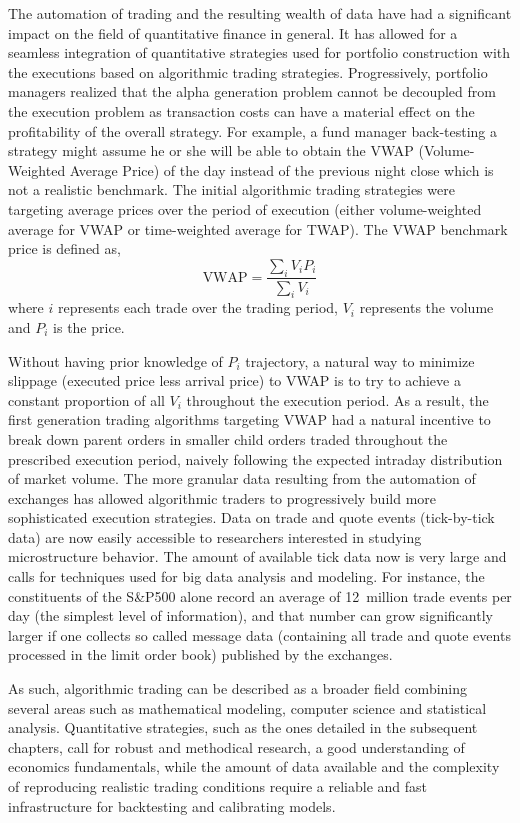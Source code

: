 The automation of trading and the resulting wealth of data have had a significant impact on the field of quantitative finance in general. It has allowed for a seamless integration of quantitative strategies used for portfolio construction with the executions based on algorithmic trading strategies. Progressively, portfolio managers realized that the alpha generation problem cannot be decoupled from the execution problem as transaction costs can have a material effect on the profitability of the overall strategy. For example, a fund manager back-testing a strategy might assume he or she will be able to obtain the VWAP (Volume-Weighted Average Price) of the day instead of the previous night close which is not a realistic benchmark. The initial algorithmic trading strategies were targeting average prices over the period of execution (either volume-weighted average for VWAP or time-weighted average for TWAP). The VWAP benchmark price is defined as,
	\begin{equation} 
	\text{VWAP}=\dfrac{\sum_iV_iP_i}{\sum_iV_i} 
	\end{equation}
where $i$ represents each trade over the trading period, $V_i$ represents the volume and $P_i$ is the price.


Without having prior knowledge of $P_i$ trajectory, a natural way to minimize slippage (executed price less arrival price) to VWAP is to try to achieve a constant proportion of all $V_i$ throughout the execution period. As a result, the first generation trading algorithms targeting VWAP had a natural incentive to break down parent orders in smaller child orders traded throughout the prescribed execution period, naively following the expected intraday distribution of market volume. The more granular data resulting from the automation of exchanges has allowed algorithmic traders to progressively build more sophisticated execution strategies. Data on trade and quote events (tick-by-tick data) are now easily accessible to researchers interested in studying microstructure behavior. The amount of available tick data now is very large and calls for techniques used for big data analysis and modeling. For instance, the constituents of the S\&P500 alone record an average of 12~million trade events per day (the simplest level of information), and that number can grow significantly larger if one collects so called message data (containing all trade and quote events processed in the limit order book) published by the exchanges.


As such, algorithmic trading can be described as a broader field combining several areas such as mathematical modeling, computer science and statistical analysis. Quantitative strategies, such as the ones detailed in the subsequent chapters, call for robust and methodical research, a good understanding of economics fundamentals, while the amount of data available and the complexity of reproducing realistic trading conditions require a reliable and fast infrastructure for backtesting and calibrating models.


